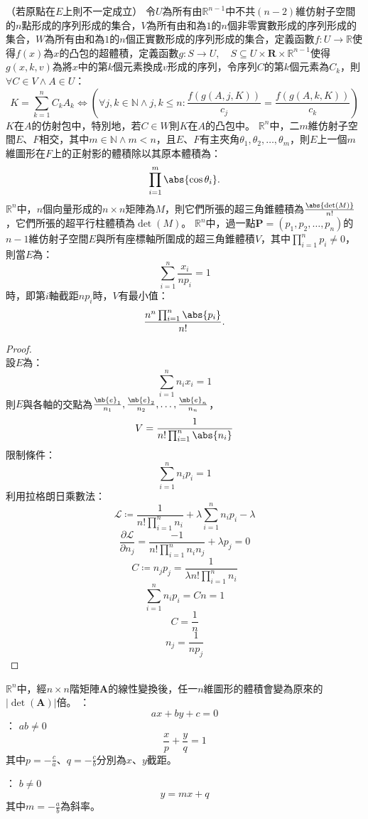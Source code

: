 \documentclass[a4paper,12pt]{report}
\begin{document}
（若原點在$E$上則不一定成立）
令$U$為所有由$\mathbb{R}^{n-1}$中不共$(n-2)$維仿射子空間的$n$點形成的序列形成的集合，$V$為所有由和為$1$的$n$個非零實數形成的序列形成的集合，$W$為所有由和為$1$的$n$個正實數形成的序列形成的集合，定義函數$f\colon U\to\mathbb{R}$使得$f(x)$為$x$的凸包的超體積，定義函數$g\colon S\to U,\quad S\subseteq U\times\mathbf{R}\times\mathbb{R}^{n-1}$使得$g(x,k,v)$為將$x$中的第$k$個元素換成$v$形成的序列，令序列$C$的第$k$個元素為$C_k$，則$\forall C\in V\land A\in U$：
\[K=\sum_{k=1}^nC_kA_k\iff\left(\forall j,k\in\mathbb{N}\land j,k\leq n\colon\frac{f\left(g(A,j,K)\right)}{c_j}=\frac{f\left(g(A,k,K)\right)}{c_k}\right)\]
$K$在$A$的仿射包中，特別地，若$C\in W$則$K$在$A$的凸包中。
$\mathbb{R}^n$中，二$m$維仿射子空間$E$、$F$相交，其中$m\in\mathbb{N}\land m<n$，且$E$、$F$有主夾角$\theta_1,\theta_2,\ldots,\theta_m$，則$E$上一個$m$維圖形在$F$上的正射影的體積除以其原本體積為：
\[\prod_{i=1}^{m}\abs{\cos\theta_i}.\]
$\mathbb{R}^n$中，$n$個向量形成的$n\times n$矩陣為$M$，則它們所張的超三角錐體積為$\frac{\abs{\det(M)}}{n!}$，它們所張的超平行柱體積為$\det(M)$。
$\mathbb{R}^n$中，過一點$\mathbf{P}=(p_1,p_2,\ldots,p_n)$的$n-1$維仿射子空間$E$與所有座標軸所圍成的超三角錐體積$V$，其中$\prod_{i=1}^np_i\neq 0$，則當$E$為：
\[\sum_{i=1}^n\frac{x_i}{np_i}=1\]
時，即第$i$軸截距$np_i$時，$V$有最小值：
\[\frac{n^n\prod_{i=1}^n\abs{p_i}}{n!}.\]
\begin{proof}\mbox{}\\
設$E$為：
\[\sum_{i=1}^nn_ix_i=1\]
則$E$與各軸的交點為$\frac{\mb{e}_1}{n_1},\frac{\mb{e}_2}{n_2},\ldots,\frac{\mb{e}_n}{n_n}$，
\[V=\frac{1}{n!\prod_{i=1}^n\abs{n_i}}\]
限制條件：
\[\sum_{i=1}^nn_ip_i=1\]
利用拉格朗日乘數法：
\[\mathcal{L}\coloneq\frac{1}{n!\prod_{i=1}^nn_i}+\lambda\sum_{i=1}^nn_ip_i-\lambda\]
\[\frac{\partial\mathcal{L}}{\partial n_j}=\frac{-1}{n!\prod_{i=1}^nn_in_j}+\lambda p_j=0\]
\[C\coloneq n_jp_j=\frac{1}{\lambda  n!\prod_{i=1}^nn_i}\]
\[\sum_{i=1}^nn_ip_i=Cn=1\]
\[C=\frac{1}{n}\]
\[n_j=\frac{1}{np_j}\]
\end{proof}
$\mathbb{R}^n$中，經$n\times n$階矩陣$\mathbf{A}$的線性變換後，任一$n$維圖形的體積會變為原來的$|\det(\mathbf{A})|$倍。
：
\[ax+by+c=0\]
：
$ab\neq 0$
\[\frac{x}{p}+\frac{y}{q}=1\]
其中$p=-\frac{c}{a}$、$q=-\frac{c}{b}$分別為$x$、$y$截距。

：
$b\neq 0$
\[y=mx+q\]
其中$m=-\frac{a}{b}$為斜率。
\end{document}
